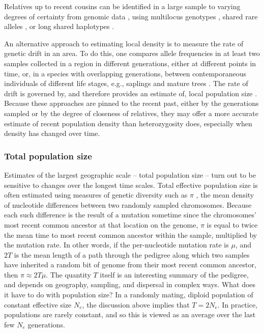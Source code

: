 \documentclass{ar-1col}
\begin{document}
Relatives up to recent cousins can be identified in a large sample to varying degrees of certainty 
from genomic data \citep[reviewed in][]{Wang2016Prediction},
using multilocus genotypes \citep{nomura2008estimation,WaplesWaples2011,Wang_2014},
shared rare alleles \citep{NovembreSlatkin2009}, 
or long shared haplotypes \citep[e.g.,][]{li2014relationship}.

An alternative approach to estimating local density
is to measure the rate of genetic drift in an area.
To do this, one compares allele frequencies
in at least two samples collected in a region in different generations, 
either at different points in time,
or, in a species with overlapping generations, 
between contemporaneous individuals of different life stages, 
e.g., saplings and mature trees
\citep{WilliamsonSlatkin1999}.
The rate of drift is governed by, 
and therefore provides an estimate of, 
local population size
\citep{ewens2004mpg,Charlesworth2009}.
Because these approaches are pinned to the recent past, 
either by the generations sampled or by the degree of closeness of relatives,
they may offer a more accurate estimate of recent population density than heterozygosity does, 
especially when density has changed over time.

\subsubsection{Total population size}

Estimates of the largest geographic scale -- total population size --
turn out to be sensitive to changes over the longest time scales.
Total effective population size is often estimated using measures of genetic diversity such as $\pi$ \citep{NeiLi1979,Tajima89},
the mean density of nucleotide differences between two randomly sampled chromosomes.
Because each such difference is the result of a mutation
sometime since the chromosomes' most recent common ancestor at that location on the genome,
$\pi$ is equal to twice the mean time to most recent common ancestor
within the sample, multiplied by the mutation rate.
In other words, if the per-nucleotide mutation rate is $\mu$,
and $2T$ is the mean length of a path through the pedigree
along which two samples have inherited a random bit of genome
from their most recent common ancestor,
then $\pi \approx 2 T \mu$.
The quantity $T$ itself is an interesting summary of the pedigree,
and depends on geography, sampling, and dispersal in complex ways.
What does it have to do with population size?
In a randomly mating, diploid population of constant effective size $N_e$,
the discussion above implies that $T = 2N_e$.
In practice, populations are rarely constant, and so this is viewed as an average
over the last few $N_e$ generations.
\end{document}
